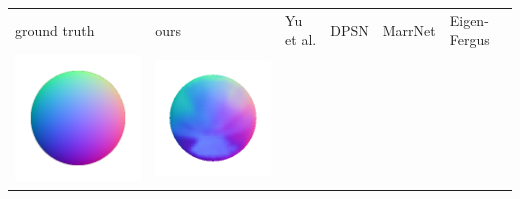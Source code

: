 \begin{center}
\begin{tabularx}{\linewidth}{@{}Y@{}Y@{}Y@{}Y@{}Y@{}Y@{}}
ground truth & ours & Yu et al. & DPSN & MarrNet & Eigen-Fergus \\
\includegraphics[width=\linewidth]{semisynthetic/20160617_13_gt.png} &
\includegraphics[width=\linewidth]{semisynthetic/20160617_13_ours_out.png} &

\end{tabularx}
\end{center}
